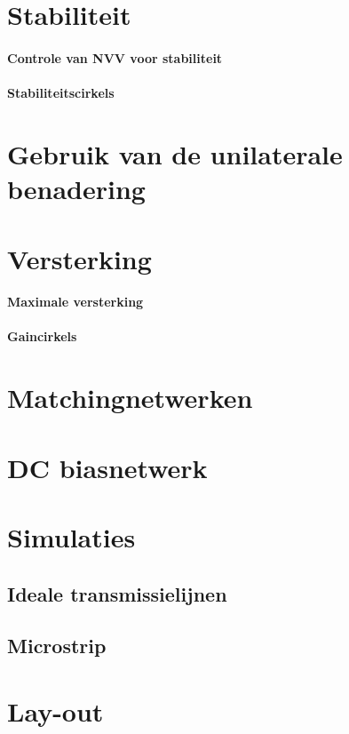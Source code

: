 \section{Stabiliteit}
  \paragraph{Controle van NVV voor stabiliteit}
  \paragraph{Stabiliteitscirkels}

\section{Gebruik van de unilaterale benadering}

\section{Versterking}
  \paragraph{Maximale versterking}
  \paragraph{Gaincirkels}

\section{Matchingnetwerken}

\section{DC biasnetwerk}

\section{Simulaties}
  \subsection{Ideale transmissielijnen}
  \subsection{Microstrip}

\section{Lay-out}

